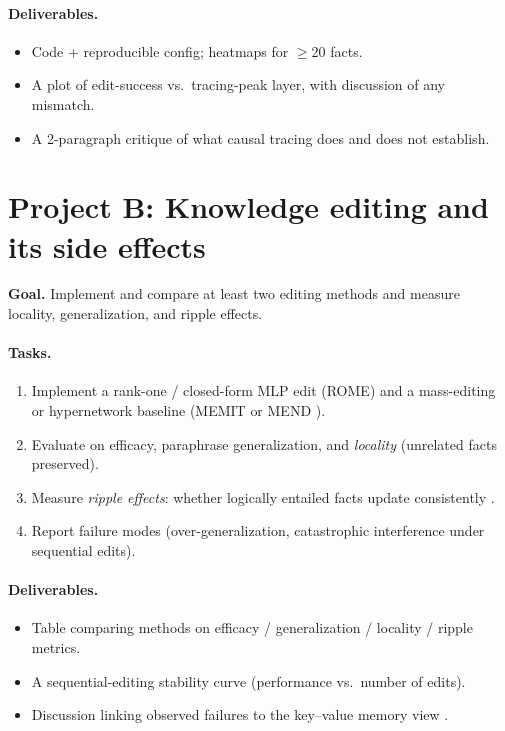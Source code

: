 \documentclass[11pt]{article}
\begin{document}
\paragraph{Deliverables.}
\begin{itemize}[leftmargin=*]
  \item Code + reproducible config; heatmaps for $\geq 20$ facts.
  \item A plot of edit-success vs.\ tracing-peak layer, with discussion of any mismatch.
  \item A 2-paragraph critique of what causal tracing does and does not establish.
\end{itemize}

\section{Project B: Knowledge editing and its side effects}
\textbf{Goal.} Implement and compare at least two editing methods and measure locality, generalization, and ripple effects.

\paragraph{Tasks.}
\begin{enumerate}[leftmargin=*]
  \item Implement a rank-one / closed-form MLP edit (ROME) \citep{meng2022rome} and a mass-editing or hypernetwork baseline (MEMIT \citep{meng2023memit} or MEND \citep{mitchell2022mend}).
  \item Evaluate on efficacy, paraphrase generalization, and \emph{locality} (unrelated facts preserved).
  \item Measure \emph{ripple effects}: whether logically entailed facts update consistently \citep{cohen2023evaluating}.
  \item Report failure modes (over-generalization, catastrophic interference under sequential edits).
\end{enumerate}

\paragraph{Deliverables.}
\begin{itemize}[leftmargin=*]
  \item Table comparing methods on efficacy / generalization / locality / ripple metrics.
  \item A sequential-editing stability curve (performance vs.\ number of edits).
  \item Discussion linking observed failures to the key--value memory view \citep{geva2021kv}.
\end{itemize}
\end{document}
